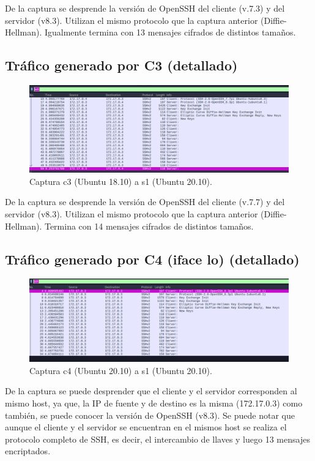 \documentclass[letter,12pt]{article}
\begin{document}
De la captura se desprende la versión de OpenSSH del cliente (v.7.3) y del servidor (v8.3). Utilizan el mismo protocolo que la captura anterior (Diffie-Hellman). Igualmente termina con 13 mensajes cifrados de distintos tamaños.

\subsection{Tráfico generado por C3 (detallado)}
\begin{figure}[H]
  \centering
  \includegraphics[width=16cm]{Images/03-capture-c3-to-c4.png}
  \caption{Captura c3 (Ubuntu 18.10) a s1 (Ubuntu 20.10).}
\end{figure}

De la captura se desprende la versión de OpenSSH del cliente (v.7.7) y del servidor (v8.3). Utilizan el mismo protocolo que la captura anterior (Diffie-Hellman). Termina con 14 mensajes cifrados de distintos tamaños.

\subsection{Tráfico generado por C4 (iface lo) (detallado)}

\begin{figure}[H]
  \centering
  \includegraphics[width=16cm]{Images/04-capture-c4-to-c4.png}
  \caption{Captura c4 (Ubuntu 20.10) a s1 (Ubuntu 20.10).}
\end{figure}

De la captura se puede desprender que el cliente y el servidor corresponden al mismo host, ya que, la IP de fuente y de destino es la misma (172.17.0.3) como también, se puede conocer la versión de OpenSSH (v8.3). Se puede notar que aunque el cliente y el servidor se encuentran en el mismos host se realiza el protocolo completo de SSH, es decir, el intercambio de llaves y luego 13 mensajes encriptados.
\end{document}
